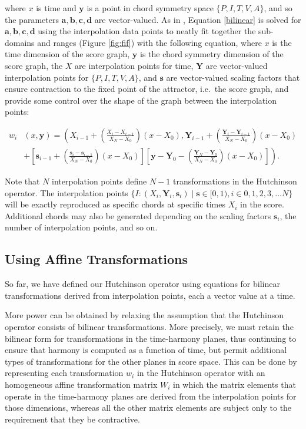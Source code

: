 \documentclass[english,11pt,letterpaper,onecolumn]{scrartcl}
\numberwithin{equation}{section}
\begin{document}
\noindent where $x$ is time and $\mathbf{y}$ is a point in chord symmetry space $\{P,
I, T, V, A\}$, and so the parameters $\mathbf{a, b, c, d}$ are vector-valued.
As in \cite{2012arXiv1209.3139B}, Equation \eqref{bilinear} is solved for
$\mathbf{a, b, c, d}$ using the interpolation data points to neatly fit together
the sub-domains and ranges (Figure \ref{fig:fif}) with the following
equation, where $x$ is the time dimension of the score graph, $\mathbf{y}$ is
the chord symmetry dimension of the score graph, the $X$ are interpolation
points for time, $\mathbf{Y}$ are vector-valued interpolation points for $\{P,
I, T, V, A\}$, and $\mathbf{s}$ are vector-valued scaling factors that ensure
contraction to the fixed point of the attractor, i.e.\ the score graph, and
provide some control over the shape of the graph between the interpolation
points:

\begin{align}
w_{i} &  (x,\mathbf{y})= \left(X_{i-1}+ \left(  \frac{X_{i}-X_{i-1}}{X_{N}-X_{0}}\right)
(x-X_{0}),\mathbf{Y}_{i-1}+\left(  \frac{\mathbf{Y}_{i}-\mathbf{Y}_{i-1}}{X_{N}-X_{0}%
}\right)  (x-X_{0})\right.\label{bilinear2}\\
& \left. + \left[  \mathbf{s}_{i-1}+\left(  \frac{\mathbf{s}_{i}-\mathbf{s}_{i-1}}{X_{N}-X_{0}}\right)
(x-X_{0})\right]  \left[  \mathbf{y}-\mathbf{Y}_{0}-\left(  \frac{\mathbf{Y}_{N}-\mathbf{Y}_{0}}{X_{N}-X_{0}%
}\right)  (x-X_{0})\right]\right)  .\nonumber
\end{align}

Note that $N$ interpolation points define $N-1$ transformations in the
Hutchinson operator. The interpolation points $\{I : (X_i, \mathbf{Y}_i,
\mathbf{s}_i) \mid \mathbf{s} \in [0, 1), i \in 0, 1, 2, 3, \dots N\}$ will be
exactly reproduced as specific chords at specific times $X_i$ in the score.
Additional chords may also be generated depending on the scaling factors
$\mathbf{s}_i$, the number of interpolation points, and so on.

\subsection{Using Affine Transformations}

So far, we have defined our Hutchinson operator using equations for bilinear
transformations derived from interpolation points, each a vector value at a
time.

More power can be obtained by relaxing the assumption that the Hutchinson
operator consists of bilinear transformations. More precisely, we must retain
the bilinear form for transformations in the time-harmony planes, thus
continuing to ensure that harmony is computed as a function of time, but permit
additional types of transformations for the other planes in score space. This
can be done by representing each transformation $w_{i}$ in the Hutchinson
operator with an homogeneous affine transformation matrix $W_{i}$ in which the
matrix elements that operate in the time-harmony planes are derived from the
interpolation points for those dimensions, whereas all the other matrix elements
are subject only to the requirement that they be contractive.
\end{document}

